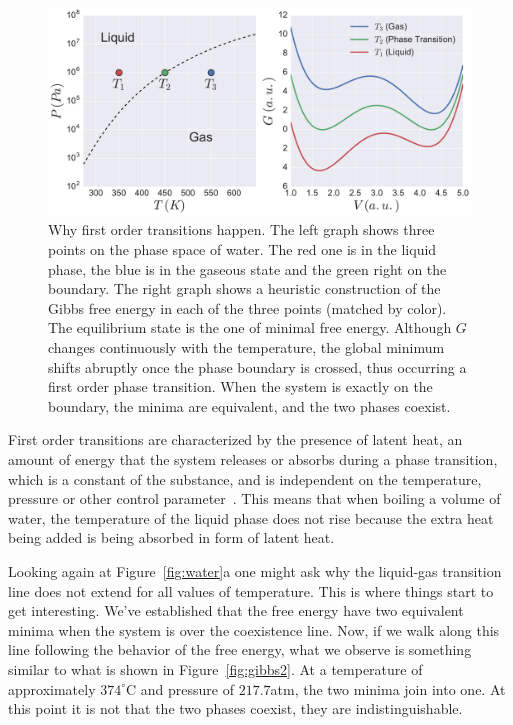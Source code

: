 \begin{figure}[h]
\begin{center}
    \includegraphics[scale=0.4]{chapters/ch2-crit/figs/gibbs1}
\end{center}
\caption{Why first order transitions happen. The left graph shows three points
    on the phase space of water. The red one is in the liquid phase, the blue
    is in the gaseous state and the green right on the boundary. The right
    graph shows a heuristic construction of the Gibbs free energy in each of
    the three points (matched by color). The equilibrium state is the one of
    minimal free energy. Although $G$ changes continuously with the
    temperature, the global minimum shifts abruptly once the phase boundary is
    crossed, thus occurring a first order phase transition. When the system is
    exactly on the boundary, the minima are equivalent, and the two phases
    coexist.}
\label{fig:gibbs1}
\end{figure}


First order transitions are characterized by the presence of latent heat, an
amount of energy that the system releases or absorbs during a phase transition,
which is a constant of the substance, and is independent on the temperature,
pressure or other control parameter~\cite{Callen1985}. This means that when
boiling a volume of water, the temperature of the liquid phase does not rise
because the extra heat being added is being absorbed in form of latent heat.

Looking again at Figure~\ref{fig:water}a one might ask why the liquid-gas
transition line does not extend for all values of temperature. This is where
things start to get interesting. We've established that the free energy have
two equivalent minima when the system is over the coexistence line. Now, if we
walk along this line following the behavior of the free energy, what we observe
is something similar to what is shown in Figure~\ref{fig:gibbs2}. At a
temperature of approximately $374^\circ$C and pressure of $217.7$atm, the two
minima join into one. At this point it is not that the two phases coexist, they
are indistinguishable.

